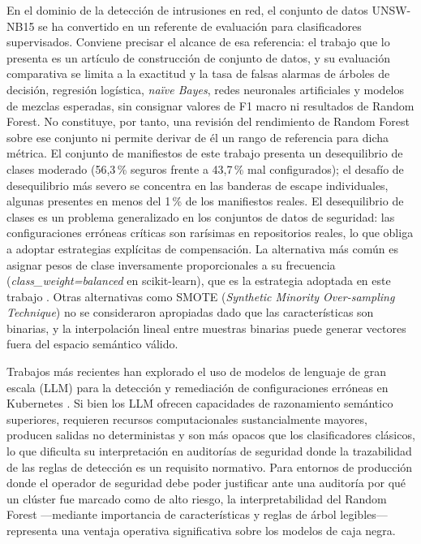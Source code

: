 En el dominio de la detección de intrusiones en red, el conjunto de datos UNSW-NB15
\citep{Moustafa2015} se ha convertido en un referente de evaluación para clasificadores
supervisados. Conviene precisar el alcance de esa referencia: el trabajo que lo
presenta es un artículo de construcción de conjunto de datos, y su evaluación
comparativa se limita a la exactitud y la tasa de falsas alarmas de árboles de
decisión, regresión logística, \textit{naïve Bayes}, redes neuronales artificiales
y modelos de mezclas esperadas, sin consignar valores de F1 macro ni resultados de
Random Forest. No constituye, por tanto, una revisión del rendimiento de
Random Forest sobre ese conjunto ni permite derivar de él un rango de
referencia para dicha métrica.
El conjunto de manifiestos de este trabajo presenta un desequilibrio
de clases moderado (56,3\,\% seguros frente a 43,7\,\% mal configurados); el
desafío de desequilibrio más severo se concentra en las banderas de escape
individuales, algunas presentes en menos del 1\,\% de los manifiestos reales.
El desequilibrio de clases es un problema generalizado
en los conjuntos de datos de seguridad: las configuraciones erróneas críticas son rarísimas en
repositorios reales, lo que obliga a adoptar estrategias explícitas de compensación.
La alternativa más común es asignar pesos de clase inversamente proporcionales a su
frecuencia (\textit{class\_weight=balanced} en scikit-learn), que es la
estrategia adoptada en este trabajo \citep{Pedregosa2011}. Otras alternativas como
\acs{SMOTE} (\textit{Synthetic Minority Over-sampling Technique}) no se consideraron
apropiadas dado que las características son binarias, y la interpolación lineal
entre muestras binarias puede generar vectores fuera del espacio semántico válido.

Trabajos más recientes han explorado el uso de modelos de lenguaje de gran escala
(\acs{LLM}) para la detección y remediación de configuraciones erróneas en
Kubernetes \citep{Malul2024}. Si bien los \acs{LLM} ofrecen
capacidades de razonamiento semántico
superiores, requieren recursos computacionales sustancialmente mayores, producen
salidas no deterministas y son más opacos que los clasificadores clásicos, lo que
dificulta su interpretación en auditorías de seguridad donde la trazabilidad de las
reglas de detección es un requisito normativo. Para entornos de producción donde el
operador de seguridad debe poder justificar ante una auditoría por qué un clúster
fue marcado como de alto riesgo, la interpretabilidad del Random Forest
—mediante importancia de características y reglas de árbol legibles— representa una
ventaja operativa significativa sobre los modelos de caja negra.


